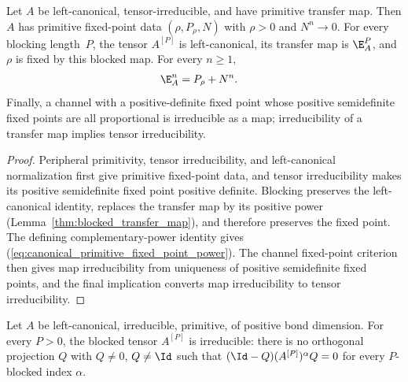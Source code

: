 \begin{lemma}%
    \label{lem:blocked_irreducibility_direct_support}
    \leanok
    Let $A$ be left-canonical, tensor-irreducible, and have primitive transfer
    map. Then $A$ has primitive fixed-point data $(\rho,P_\rho,N)$ with
    $\rho>0$ and $N^n\to0$. For every blocking length~$P$, the tensor
    $A^{[P]}$ is left-canonical, its transfer map is $\E_A^P$, and $\rho$ is
    fixed by this blocked map. For every $n\ge1$,
    \begin{align}
        \E_A^n
         & =P_\rho+N^n.
        \label{eq:canonical_primitive_fixed_point_power}
    \end{align}
    Finally, a channel with a positive-definite fixed point whose positive
    semidefinite fixed points are all proportional is irreducible as a map;
    irreducibility of a transfer map implies tensor irreducibility.
\end{lemma}

\begin{proof}\leanok
    Peripheral primitivity, tensor irreducibility, and left-canonical
    normalization first give primitive fixed-point data, and tensor
    irreducibility makes its positive semidefinite fixed point positive
    definite. Blocking preserves the left-canonical identity, replaces the
    transfer map by its positive power
    (Lemma~\ref{thm:blocked_transfer_map}), and therefore preserves the fixed
    point. The defining complementary-power identity gives
    (\ref{eq:canonical_primitive_fixed_point_power}). The channel fixed-point
    criterion then gives map irreducibility from uniqueness of positive
    semidefinite fixed points, and the final implication converts map
    irreducibility to tensor irreducibility.
\end{proof}

\begin{lemma}%
    \label{thm:blocked_irreducible_tp_primitive}
    \leanok
    Let $A$ be left-canonical, irreducible, primitive, of positive bond
    dimension. For every $P>0$, the blocked tensor $A^{[P]}$ is irreducible:
    there is no orthogonal projection $Q$ with $Q\neq0$, $Q\neq\Id$ such that
    $(\Id-Q)(A^{[P]})^\alpha Q=0$ for every $P$-blocked index $\alpha$.
\end{lemma}

